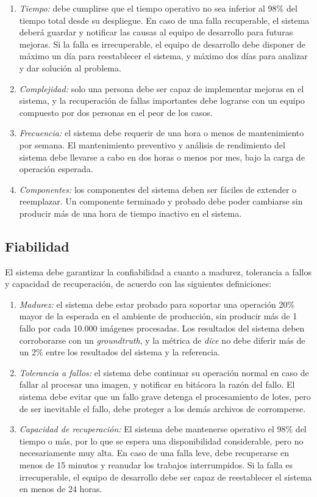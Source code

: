 \documentclass{scrreprt}
\begin{document}
\begin{enumerate}[label=\alph*.]
	\item \textit{Tiempo:} debe cumplirse que el tiempo operativo no sea inferior al 98\% del tiempo total desde su despliegue. En caso de una falla recuperable, el sistema deberá guardar y notificar las causas al equipo de desarrollo para futuras mejoras. Si la falla es irrecuperable, el equipo de desarrollo debe disponer de máximo un día para reestablecer el sistema, y máximo dos días para analizar y dar solución al problema.
    \item \textit{Complejidad:} solo una persona debe ser capaz de implementar mejoras en el sistema, y la recuperación de fallas importantes debe lograrse con un equipo compuesto por dos personas en el peor de los casos.
    \item \textit{Frecuencia:} el sistema debe requerir de una hora o menos de mantenimiento por semana. El mantenimiento preventivo y análisis de rendimiento del sistema debe llevarse a cabo en dos horas o menos por mes, bajo la carga de operación esperada.
    \item \textit{Componentes:} los componentes del sistema deben ser fáciles de extender o reemplazar. Un componente terminado y probado debe poder cambiarse sin producir más de una hora de tiempo inactivo en el sistema.
\end{enumerate}


\subsection{Fiabilidad}

El sistema debe garantizar la confiabilidad a cuanto a madurez, tolerancia a fallos y capacidad de recuperación, de acuerdo con las siguientes definiciones:

\begin{enumerate}[label=\alph*.]
	\item \textit{Madurez:} el sistema debe estar probado para soportar una operación 20\% mayor de la esperada en el ambiente de producción, sin producir más de 1 fallo por cada 10.000 imágenes procesadas. Los resultados del sistema deben corroborarse con un \textit{groundtruth}, y la métrica de \textit{dice} no debe diferir más de un 2\% entre los resultados del sistema y la referencia.
    \item \textit{Tolerancia a fallos:} el sistema debe continuar su operación normal en caso de fallar al procesar una imagen, y notificar en bitácora la razón del fallo. El sistema debe evitar que un fallo grave detenga el procesamiento de lotes, pero de ser inevitable el fallo, debe proteger a los demás archivos de corromperse.
    \item \textit{Capacidad de recuperación:} El sistema debe mantenerse operativo el 98\% del tiempo o más, por lo que se espera una disponibilidad considerable, pero no necesariamente muy alta. En caso de una falla leve, debe recuperarse en menos de 15 minutos y reanudar los trabajos interrumpidos. Si la falla es irrecuperable, el equipo de desarrollo debe ser capaz de reestablecer el sistema en menos de 24 horas.
\end{enumerate}
\end{document}
